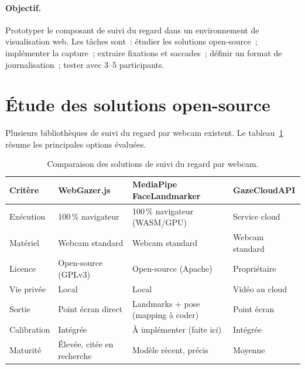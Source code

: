 \documentclass[11pt,a4paper]{article}
\begin{document}
\paragraph{Objectif.} Prototyper le composant de suivi du regard dans un
environnement de visualisation web. Les tâches sont~: étudier les solutions
open-source~; implémenter la capture~; extraire fixations et saccades~;
définir un format de journalisation~; tester avec 3--5 participants.

\section{Étude des solutions open-source}

Plusieurs bibliothèques de suivi du regard par webcam existent. Le tableau~\ref{tab:compare}
résume les principales options évaluées.

\begin{table}[h]
\centering
\renewcommand{\arraystretch}{1.25}
\begin{tabular}{>{\raggedright\arraybackslash}p{2.7cm} p{3.0cm} p{3.0cm} p{3.0cm}}
\toprule
\textbf{Critère} & \textbf{WebGazer.js} & \textbf{MediaPipe FaceLandmarker} & \textbf{GazeCloudAPI} \\
\midrule
Exécution & 100\,\% navigateur & 100\,\% navigateur (WASM/GPU) & Service cloud \\
Matériel & Webcam standard & Webcam standard & Webcam standard \\
Licence & Open-source (GPLv3) & Open-source (Apache) & Propriétaire \\
Vie privée & Local & Local & Vidéo au cloud \\
Sortie & Point écran direct & Landmarks + pose (mapping à coder) & Point écran \\
Calibration & Intégrée & À implémenter (faite ici) & Intégrée \\
Maturité & Élevée, citée en recherche & Modèle récent, précis & Moyenne \\
\bottomrule
\end{tabular}
\caption{Comparaison des solutions de suivi du regard par webcam.}
\label{tab:compare}
\end{table}
\end{document}

